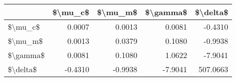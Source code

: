 \begin{tabular}{lrrrr}
\toprule
{} &  \$\textbackslash mu\_c\$ &  \$\textbackslash mu\_m\$ &  \$\textbackslash gamma\$ &  \$\textbackslash delta\$ \\
\midrule
\$\textbackslash mu\_c\$  &   0.0007 &   0.0013 &    0.0081 &   -0.4310 \\
\$\textbackslash mu\_m\$  &   0.0013 &   0.0379 &    0.1080 &   -0.9938 \\
\$\textbackslash gamma\$ &   0.0081 &   0.1080 &    1.0622 &   -7.9041 \\
\$\textbackslash delta\$ &  -0.4310 &  -0.9938 &   -7.9041 &  507.0663 \\
\bottomrule
\end{tabular}
